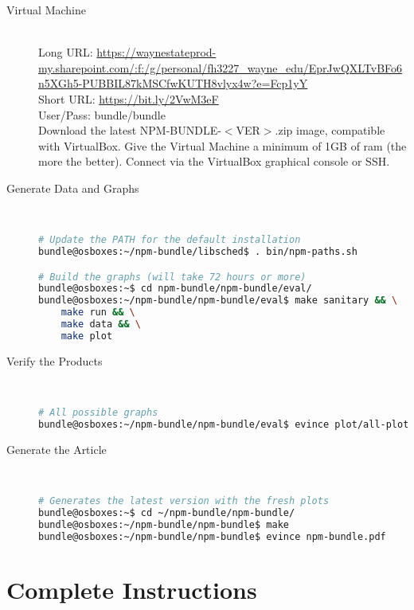 \documentclass[a4paper]{article}
\begin{document}
\begin{description}
  \item[Virtual Machine] \hfill \\
    Long URL: \href{https://waynestateprod-my.sharepoint.com/:f:/g/personal/fh3227\_wayne\_edu/EprJwQXLTvBFo6n5XGh5-PUBBIL87kMSCfwKUTH8vlyx4w?e=Fcp1yY}{https://waynestateprod-my.sharepoint.com/:f:/g/personal/fh3227\_wayne\_edu/EprJwQXLTvBFo6n5XGh5-PUBBIL87kMSCfwKUTH8vlyx4w?e=Fcp1yY} \\
    Short URL: \href{https://bit.ly/2VwM3eF}{https://bit.ly/2VwM3eF}
    \hfill \\
    User/Pass: bundle/bundle \\

    Download the latest NPM-BUNDLE-${<}$VER${>}$.zip image, compatible
    with VirtualBox. Give the Virtual Machine a minimum of 1GB of ram
    (the more the better). Connect via the VirtualBox graphical
    console or SSH.
    
  \item[Generate Data and Graphs] \hfill \\
    \begin{lstlisting}[language=bash]
# Update the PATH for the default installation
bundle@osboxes:~/npm-bundle/libsched$ . bin/npm-paths.sh

# Build the graphs (will take 72 hours or more)
bundle@osboxes:~$ cd npm-bundle/npm-bundle/eval/
bundle@osboxes:~/npm-bundle/npm-bundle/eval$ make sanitary && \
    make run && \
    make data && \
    make plot
    \end{lstlisting}
  \item[Verify the Products] \hfill \\
    \begin{lstlisting}[language=bash]
# All possible graphs
bundle@osboxes:~/npm-bundle/npm-bundle/eval$ evince plot/all-plots.pdf
    \end{lstlisting}
  \item[Generate the Article] \hfill \\
    \begin{lstlisting}[language=bash]
# Generates the latest version with the fresh plots
bundle@osboxes:~$ cd ~/npm-bundle/npm-bundle/
bundle@osboxes:~/npm-bundle/npm-bundle$ make
bundle@osboxes:~/npm-bundle/npm-bundle$ evince npm-bundle.pdf
    \end{lstlisting}
\end{description}

\clearpage

\section{Complete Instructions}
\end{document}

